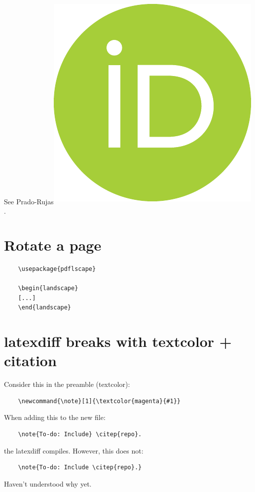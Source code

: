 \documentclass[11pt,a4paper,english,twoside,notitlepage,openright]{article}
\newcommand{\orcid}[1]{\textsuperscript{\href{https://orcid.org/#1}{\includegraphics[scale=0.04]{00_orcid.pdf}}}}
\begin{document}
See Prado-Rujas{\orcid{0000-0003-4018-8725}}.

\section{Rotate a page}

\begin{verbatim}
	\usepackage{pdflscape}
	
	\begin{landscape}
	[...]
	\end{landscape}
\end{verbatim}

\section{latexdiff breaks with textcolor + citation}

Consider this in the preamble (textcolor):
\begin{verbatim}
	\newcommand{\note}[1]{\textcolor{magenta}{#1}}
\end{verbatim}
When adding this to the new file:
\begin{verbatim}
	\note{To-do: Include} \citep{repo}.
\end{verbatim}
the latexdiff compiles. However, this does not:
\begin{verbatim}
	\note{To-do: Include \citep{repo}.}
\end{verbatim}
Haven't understood why yet.
\end{document}
